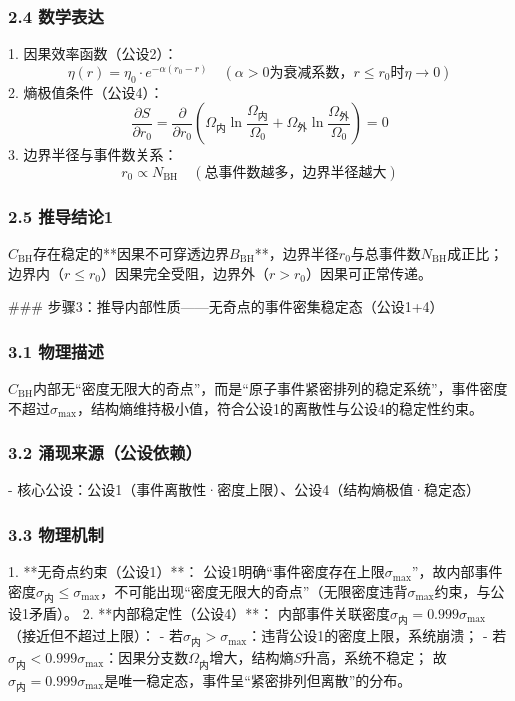 \documentclass{article}
\begin{document}
\subsubsection{2.4 数学表达}
1. 因果效率函数（公设2）：  
   \[
   \eta(r) = \eta_0 \cdot e^{-\alpha (r_0 - r)} \quad (\alpha > 0为衰减系数，r \leq r_0时\eta \to 0)
   \]
2. 熵极值条件（公设4）：  
   \[
   \frac{\partial S}{\partial r_0} = \frac{\partial}{\partial r_0} \left( \Omega_{\text{内}} \ln\frac{\Omega_{\text{内}}}{\Omega_0} + \Omega_{\text{外}} \ln\frac{\Omega_{\text{外}}}{\Omega_0} \right) = 0
   \]
3. 边界半径与事件数关系：  
   \[
   r_0 \propto N_{\text{BH}} \quad (\text{总事件数越多，边界半径越大})
   \]

\subsubsection{2.5 推导结论1}
\(C_{\text{BH}}\)存在稳定的**因果不可穿透边界\(B_{\text{BH}}\)**，边界半径\(r_0\)与总事件数\(N_{\text{BH}}\)成正比；边界内（\(r \leq r_0\)）因果完全受阻，边界外（\(r > r_0\)）因果可正常传递。


### 步骤3：推导内部性质——无奇点的事件密集稳定态（公设1+4）
\subsubsection{3.1 物理描述}
\(C_{\text{BH}}\)内部无“密度无限大的奇点”，而是“原子事件紧密排列的稳定系统”，事件密度不超过\(\sigma_{\text{max}}\)，结构熵维持极小值，符合公设1的离散性与公设4的稳定性约束。

\subsubsection{3.2 涌现来源（公设依赖）}
- 核心公设：公设1（事件离散性·密度上限）、公设4（结构熵极值·稳定态）

\subsubsection{3.3 物理机制}
1. **无奇点约束（公设1）**：  
   公设1明确“事件密度存在上限\(\sigma_{\text{max}}\)”，故内部事件密度\(\sigma_{\text{内}} \leq \sigma_{\text{max}}\)，不可能出现“密度无限大的奇点”（无限密度违背\(\sigma_{\text{max}}\)约束，与公设1矛盾）。
2. **内部稳定性（公设4）**：  
   内部事件关联密度\(\sigma_{\text{内}} = 0.999\sigma_{\text{max}}\)（接近但不超过上限）：  
   - 若\(\sigma_{\text{内}} > \sigma_{\text{max}}\)：违背公设1的密度上限，系统崩溃；  
   - 若\(\sigma_{\text{内}} < 0.999\sigma_{\text{max}}\)：因果分支数\(\Omega_{\text{内}}\)增大，结构熵\(S\)升高，系统不稳定；  
   故\(\sigma_{\text{内}} = 0.999\sigma_{\text{max}}\)是唯一稳定态，事件呈“紧密排列但离散”的分布。
\end{document}
